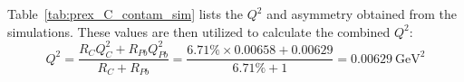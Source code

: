 Table~\ref{tab:prex_C_contam_sim} lists the $Q^2$ and asymmetry obtained from the simulations.
These values are then utilized to calculate the combined $Q^2$:
\begin{equation}
    Q^2 = \frac{R_C Q^2_C + R_{Pb} Q^2_{Pb}}{R_C + R_{Pb}} 
	= \frac{6.71\%\times 0.00658 + 0.00629}{6.71\% + 1} = 0.00629 \ \mathrm{GeV}^2
\end{equation}

\begin{comment}
\begin{landscape}
    \begin{table}
    \centering
    \begin{tabular}{c c c | c c c c c c c c c c}
	\hline
	\multicolumn{2}{c}{target thicknesses}	& \multirow{2}{*}{\makecell{p cut \\ (MeV)}}	& \multicolumn{2}{c}{$Q^2$ Pb ($\mathrm{GeV}^2$)}    & \multicolumn{2}{c}{$Q^2$ C}	& \multicolumn{2}{c}{$Q^2$ C US}  & \multicolumn{2}{c}{$Q^2$ C DS}  & \multicolumn{2}{c}{Asym (ppm)}	\\
	Pb & C	&   & vertex	& post vertex	& V	& P-V	& V & P-V   &V	& P-V	& Pb	& C \\
	\hline
	-5\%	& -5\%	& 2.2	& 0.00608   & 0.00625   & 0.00649   & 0.00658	& 0.00641   & 0.00658	& 0.00658   & 0.00658	& 0.55774   & 0.53861 \\
	-5\%	&  0\%	& 2.2	& 0.00609   & 0.00626   & 0.00648   & 0.00656	& 0.00643   & 0.00658	& 0.00654   & 0.00654	& 0.55809   & 0.53776 \\
	-5\%	&  5\%	& 2.2	& 0.00610   & 0.00627   & 0.00650   & 0.00658	& 0.00643   & 0.00658	& 0.00657   & 0.00657	& 0.55883   & 0.53932 \\
	 0\%	& -5\%	& 2.2	& 0.00611   & 0.00627   & 0.00650   & 0.00657	& 0.00643   & 0.00657	& 0.00657   & 0.00657	& 0.55942   & 0.53917 \\
	 0\%	&  0\%	& 2.2	& 0.00609   & 0.00626   & 0.00650   & 0.00658	& 0.00641   & 0.00657	& 0.00660   & 0.00660	& 0.55824   & 0.53936 \\
	 0\%	&  5\%	& 2.2	& 0.00610   & 0.00627   & 0.00649   & 0.00658	& 0.00641   & 0.00658	& 0.00658   & 0.00658	& 0.55847   & 0.53847 \\
	 5\%	& -5\%	& 2.2	& 0.00607   & 0.00625   & 0.00647   & 0.00657	& 0.00637   & 0.00655	& 0.00658   & 0.00658	& 0.55674   & 0.53696 \\
	 5\%	&  0\%	& 2.2	& 0.00609   & 0.00627   & 0.00649   & 0.00658	& 0.00641   & 0.00659	& 0.00657   & 0.00657	& 0.55782   & 0.53808 \\
	 5\%	&  5\%	& 2.2	& 0.00610   & 0.00629   & 0.00650   & 0.00659	& 0.00643   & 0.00659	& 0.00659   & 0.00659	& 0.55847   & 0.53962 \\
	\hline
	\multicolumn{3}{c}{average} &0.00609 & 0.00626	& 0.00649   & 0.00658	& 0.00642   & 0.00658	& 0.00658   & 0.00658	& 0.55820   & 0.53859 \\
    \end{tabular}
    \caption{Average $Q^2$}
    \end{table}
\end{landscape}


\end{comment}
